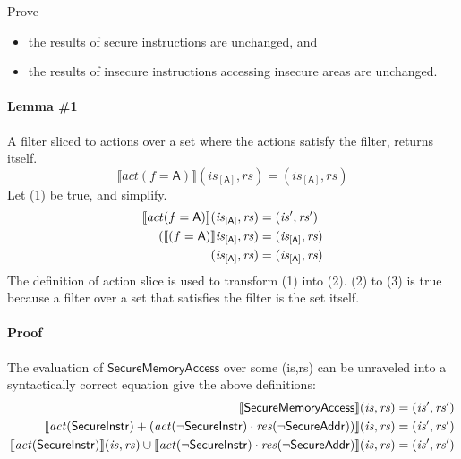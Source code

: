 \documentclass[12pt, letterpaper]{article}
\begin{document}
Prove
\begin{itemize}
    \item the results of secure instructions are unchanged, and
    \item the results of insecure instructions accessing insecure areas are unchanged.
\end{itemize}

\paragraph{Lemma \#1}
A filter sliced to actions over a set where the actions satisfy the filter, returns itself.
\[
    \llbracket act(f=\mathsf{A}) \rrbracket (\mathit{is}_{[\mathsf{A}]}, \mathit{rs}) = (\mathit{is_{[\mathsf{A}]}}, \mathit{rs})
\]
Let (1) be true, and simplify.
\begin{align}
    \setcounter{equation}{0}
    \llbracket act(f=\mathsf{A}) \rrbracket (\mathit{is}_{[\mathsf{A}]}, \mathit{rs})
    &= 
    (\mathit{is}', \mathit{rs}')
    \\
    (\llbracket (f=\mathsf{A}) \rrbracket \mathit{is}_{[\mathsf{A}]}, \mathit{rs})
    &= 
    (\mathit{is_{[\mathsf{A}]}}, \mathit{rs})
    \\
    (\mathit{is}_{[\mathsf{A}]}, \mathit{rs})
    &= 
    (\mathit{is_{[\mathsf{A}]}}, \mathit{rs})
\end{align}
The definition of action slice is used to transform (1) into (2).  (2) to (3) is true because a filter over a set that satisfies the filter is the set itself.

\paragraph{Proof}
    The evaluation of $\mathsf{SecureMemoryAccess}$ over some (is,rs) can be unraveled into a syntactically correct equation give the above definitions:
\begin{align}
    \setcounter{equation}{0}
    \llbracket \mathsf{SecureMemoryAccess} \rrbracket (\mathit{is}, \mathit{rs})
    &=
    (\mathit{is}', \mathit{rs}')
    \\
    \llbracket \mathit{act}(\mathsf{SecureInstr}) +
    (\mathit{act}(\neg\mathsf{SecureInstr}) \cdot
     \mathit{res}(\neg\mathsf{SecureAddr})) \rrbracket (\mathit{is}, \mathit{rs})
    &=
    (\mathit{is}', \mathit{rs}')
    \\
    \llbracket \mathit{act}(\mathsf{SecureInstr}) \rrbracket (\mathit{is}, \mathit{rs}) \cup %
    \llbracket \mathit{act}(\neg\mathsf{SecureInstr}) \cdot
     \mathit{res}(\neg\mathsf{SecureAddr}) \rrbracket (\mathit{is}, \mathit{rs})
    &=
    (\mathit{is}', \mathit{rs}')
    \\
\end{align}
\end{document}
